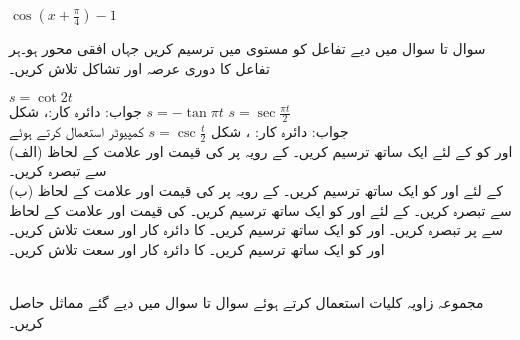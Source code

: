 $\cos (x+\tfrac{\pi}{4})-1$

سوال  تا سوال  میں دیے تفاعل کو  مستوی میں ترسیم کریں جہاں افقی محور  ہو۔ہر تفاعل کا دوری عرصہ اور تشاکل تلاش کریں۔

$s=\cot 2t$\\
جواب:\quad 
دائرہ کار:، شکل 
$s=-\tan \pi t$
$s=\sec \tfrac{\pi t}{2}$\\
جواب:\quad
دائرہ کار: ، شکل 
$s=\csc \tfrac{t}{2}$
کمپیوٹر استعمال کرتے ہوئے\\
 (الف)\quad
   اور  کو  کے لئے ایک ساتھ ترسیم کریں۔ کے رویہ  پر  کی قیمت اور علامت کے لحاظ سے تبصرہ کریں۔\\
(ب)\quad
   کے لئے  اور  کو ایک ساتھ ترسیم کریں۔  کے رویہ پر   کی قیمت اور علامت کے لحاظ سے تبصرہ کریں۔
 کے لئے  اور  کو ایک ساتھ ترسیم کریں۔ کی قیمت اور علامت کے لحاظ سے  پر تبصرہ کریں۔
 اور  کو ایک ساتھ ترسیم کریں۔ کا دائرہ کار اور سعت تلاش کریں۔
 اور  کو ایک ساتھ ترسیم کریں۔ کا دائرہ کار اور سعت تلاش کریں۔

\\

مجموعہ زاویہ کلیات استعمال کرتے ہوئے سوال  تا سوال  میں دیے گئے مماثل حاصل کریں۔

